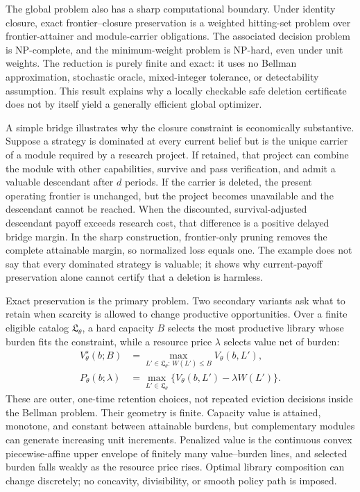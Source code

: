 The global problem also has a sharp computational boundary. Under identity
closure, exact frontier--closure preservation is a weighted hitting-set
problem over frontier-attainer and module-carrier obligations. The associated
decision problem is NP-complete, and the minimum-weight problem is NP-hard,
even under unit weights. The reduction is purely finite and exact: it uses no
Bellman approximation, stochastic oracle, mixed-integer tolerance, or
detectability assumption. This result explains why a locally checkable safe
deletion certificate does not by itself yield a generally efficient global
optimizer.

A simple bridge illustrates why the closure constraint is economically
substantive. Suppose a strategy is dominated at every current belief but is
the unique carrier of a module required by a research project. If retained,
that project can combine the module with other capabilities, survive and pass
verification, and admit a valuable descendant after \(d\) periods. If the
carrier is deleted, the present operating frontier is unchanged, but the
project becomes unavailable and the descendant cannot be reached. When the
discounted, survival-adjusted descendant payoff exceeds research cost, that
difference is a positive delayed bridge margin. In the sharp construction,
frontier-only pruning removes the complete attainable margin, so normalized
loss equals one. The example does not say that every dominated strategy is
valuable; it shows why current-payoff preservation alone cannot certify that
a deletion is harmless.

Exact preservation is the primary problem. Two secondary variants ask what to
retain when scarcity is allowed to change productive opportunities. Over a
finite eligible catalog \(\mathfrak L_\theta\), a hard capacity \(B\) selects
the most productive library whose burden fits the constraint, while a resource
price \(\lambda\) selects value net of burden:
\begin{equation}\label{eq:introduction-resource-extensions}
\begin{aligned}
 V_\theta^\star(b;B)
   &=\max_{L'\in\mathfrak L_\theta:\,W(L')\le B}V_\theta(b,L'),\\
 P_\theta(b;\lambda)
   &=\max_{L'\in\mathfrak L_\theta}
      \{V_\theta(b,L')-\lambda W(L')\}.
\end{aligned}
\end{equation}
These are outer, one-time retention choices, not repeated eviction decisions
inside the Bellman problem. Their geometry is finite. Capacity value is
attained, monotone, and constant between attainable burdens, but complementary
modules can generate increasing unit increments. Penalized value is the
continuous convex piecewise-affine upper envelope of finitely many
value--burden lines, and selected burden falls weakly as the resource price
rises. Optimal library composition can change discretely; no concavity,
divisibility, or smooth policy path is imposed.

